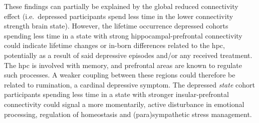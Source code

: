 These findings can partially be explained by the global reduced connectivity effect (i.e.~depressed participants spend less time in the lower connectivity strength brain state).
However, the lifetime occurrence depressed cohorts spending less time in a state with strong hippocampal-prefrontal connectivity could indicate lifetime changes or in-born differences related to the \gls{hpc}, potentially as a result of said depressive episodes and/or any received treatment.
The \gls{hpc} is involved with memory, and prefrontal areas are known to regulate such processes.
A weaker coupling between these regions could therefore be related to rumination, a cardinal depressive symptom.
%
The depressed \emph{state} cohort participants spending less time in a state with stronger insular-prefrontal connectivity could signal a more momentarily, active disturbance in emotional processing, regulation of homeostasis and (para)sympathetic stress management.



